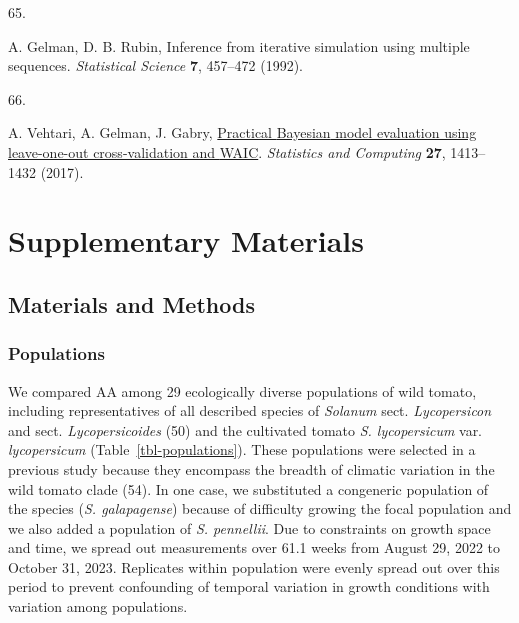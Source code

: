 \documentclass[
  letterpaper,
  DIV=11,
  numbers=noendperiod]{scrartcl}
\newlength{\cslhangindent}
\newlength{\csllabelwidth}
\newenvironment{CSLReferences}[2] %
 {\begin{list}{}{%
  \setlength{\itemindent}{0pt}
  \setlength{\leftmargin}{0pt}
  \setlength{\parsep}{0pt}
  \ifodd #1
   \setlength{\leftmargin}{\cslhangindent}
   \setlength{\itemindent}{-1\cslhangindent}
  \fi
  \setlength{\itemsep}{#2\baselineskip}}}
 {\end{list}}
\newcommand{\CSLLeftMargin}[1]{\parbox[t]{\csllabelwidth}{\strut#1\strut}}
\newcommand{\CSLRightInline}[1]{\parbox[t]{\linewidth - \csllabelwidth}{\strut#1\strut}}
\newcommand{\aax}{$\mathrm{AA}$}
\begin{document}
\begin{CSLReferences}{0}{1}
\CSLLeftMargin{65. }%
\CSLRightInline{A. Gelman, D. B. Rubin, Inference from iterative
simulation using multiple sequences. \emph{Statistical Science}
\textbf{7}, 457--472 (1992).}

\CSLLeftMargin{66. }%
\CSLRightInline{A. Vehtari, A. Gelman, J. Gabry,
\href{https://doi.org/10.1007/s11222-016-9696-4}{Practical {Bayesian}
model evaluation using leave-one-out cross-validation and {WAIC}}.
\emph{Statistics and Computing} \textbf{27}, 1413--1432 (2017).}

\end{CSLReferences}

\newpage{}

\section{Supplementary Materials}\label{supplementary-materials}

\renewcommand{\thefigure}{S\arabic{figure}}
\renewcommand{\thetable}{S\arabic{table}}
\renewcommand{\theequation}{S\arabic{equation}}
\setcounter{figure}{0}
\setcounter{table}{0}
\setcounter{equation}{0}
\setcounter{page}{1}

\subsection{Materials and Methods}\label{sec-methods}

\subsubsection{Populations}\label{populations}

We compared \aax{} among 29 ecologically diverse populations of wild
tomato, including representatives of all described species of
\emph{Solanum} sect. \emph{Lycopersicon} and sect.
\emph{Lycopersicoides} (50) and the cultivated tomato \emph{S.
lycopersicum} var. \emph{lycopersicum} (Table~\ref{tbl-populations}).
These populations were selected in a previous study because they
encompass the breadth of climatic variation in the wild tomato clade
(54). In one case, we substituted a congeneric population of the species
(\emph{S. galapagense}) because of difficulty growing the focal
population and we also added a population of \emph{S. pennellii}. Due to
constraints on growth space and time, we spread out measurements over
61.1 weeks from August 29, 2022 to October 31, 2023. Replicates within
population were evenly spread out over this period to prevent
confounding of temporal variation in growth conditions with variation
among populations.
\end{document}
